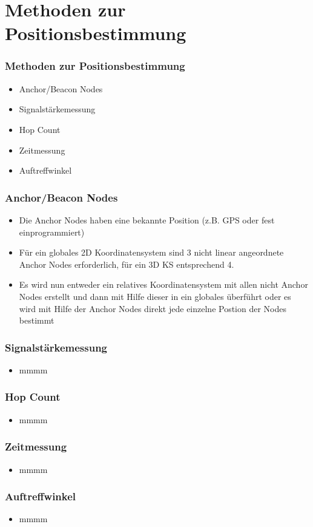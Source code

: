 \section{Methoden zur Positionsbestimmung}
\label{sec:methoden}

\begin{frame}

\frametitle{Methoden zur Positionsbestimmung}

\begin{itemize}
   \item Anchor/Beacon Nodes
   \item Signalstärkemessung
   \item Hop Count
   \item Zeitmessung
   \item Auftreffwinkel
\end{itemize}

\end{frame}

\begin{frame}
\frametitle{Anchor/Beacon Nodes}

\begin{itemize}
  \item Die Anchor Nodes haben eine bekannte Position (z.B. GPS oder fest einprogrammiert)
  \item Für ein globales 2D Koordinatensystem sind 3 nicht linear angeordnete Anchor Nodes erforderlich, für ein 3D KS entsprechend 4.
  \item Es wird nun entweder ein relatives Koordinatensystem mit allen nicht Anchor Nodes erstellt und dann mit Hilfe dieser in ein globales überführt oder es wird mit Hilfe der Anchor Nodes direkt jede einzelne Postion der Nodes bestimmt
\end{itemize}
\end{frame}

\begin{frame}
\frametitle{Signalstärkemessung}

\begin{itemize}
  \item mmmm
\end{itemize}
\end{frame}

\begin{frame}
\frametitle{Hop Count}

\begin{itemize}
  \item mmmm
\end{itemize}
\end{frame}

\begin{frame}
\frametitle{Zeitmessung}

\begin{itemize}
  \item mmmm
\end{itemize}
\end{frame}

\begin{frame}
\frametitle{Auftreffwinkel}

\begin{itemize}
  \item mmmm
\end{itemize}
\end{frame}

